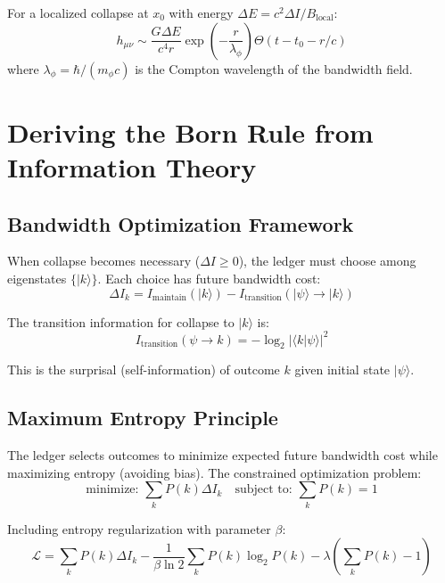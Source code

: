 \documentclass[twocolumn,prd,amsmath,amssymb,aps,superscriptaddress,nofootinbib]{revtex4-2}
\begin{document}
For a localized collapse at $x_0$ with energy $\Delta E = c^2 \Delta I/B_{\text{local}}$:
\begin{equation}
h_{\mu\nu} \sim \frac{G\Delta E}{c^4 r} \exp\left(-\frac{r}{\lambda_\phi}\right) \Theta(t - t_0 - r/c)
\label{eq:metric_perturbation}
\end{equation}
where $\lambda_\phi = \hbar/(m_\phi c)$ is the Compton wavelength of the bandwidth field.

\section{Deriving the Born Rule from Information Theory}
\label{sec:born}

\subsection{Bandwidth Optimization Framework}

When collapse becomes necessary ($\Delta I \geq 0$), the ledger must choose among eigenstates $\{|k\rangle\}$. Each choice has future bandwidth cost:
\begin{equation}
\Delta I_k = I_{\text{maintain}}(|k\rangle) - I_{\text{transition}}(|\psi\rangle \rightarrow |k\rangle)
\end{equation}

The transition information for collapse to $|k\rangle$ is:
\begin{equation}
I_{\text{transition}}(\psi \rightarrow k) = -\log_2|\langle k|\psi\rangle|^2
\end{equation}

This is the surprisal (self-information) of outcome $k$ given initial state $|\psi\rangle$.

\subsection{Maximum Entropy Principle}

The ledger selects outcomes to minimize expected future bandwidth cost while maximizing entropy (avoiding bias). The constrained optimization problem:
\begin{equation}
\text{minimize: } \sum_k P(k) \Delta I_k \quad \text{subject to: } \sum_k P(k) = 1
\end{equation}

Including entropy regularization with parameter $\beta$:
\begin{equation}
\mathcal{L} = \sum_k P(k) \Delta I_k - \frac{1}{\beta \ln 2}\sum_k P(k)\log_2 P(k) - \lambda\left(\sum_k P(k) - 1\right)
\end{equation}
\end{document}

